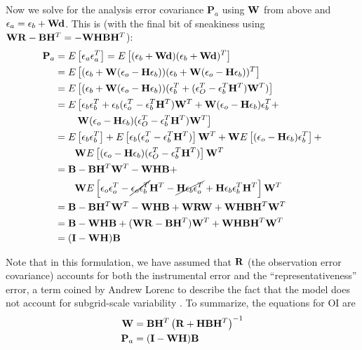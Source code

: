 \documentclass[12pt]{report}
\begin{document}
Now we solve for the analysis error covariance $\mathbf{P} _a $ using $\mbW$ from above and $\mbe _a = \mbe _b + \mbW \mbd$.
This is (with the final bit of sneakiness using $\mbW\mbR-\mbB\mbH^T=-\mbW\mbH\mbB\mbH^T$):
\begin{align*} \mathbf{P} _a &= \expv{\mbe_a \mbe_a^T} = \expv{(\mbe_b+ \mbW \mbd)(\mbe_b + \mbW \mbd)^T}\\
&= \expv{(\mbe_b + \mbW (\mbe _o - \mbH \mbe _b ) ) (\mbe_b + \mbW (\mbe _o - \mbH \mbe _b ) )^T}\\
&= \expv{(\mbe_b + \mbW (\mbe _o - \mbH \mbe _b ) ) (\mbe_b^T + (\mbe _O^T -  \mbe _b^T \mbH ^T )\mbW ^T )}\\
&= E \left [ \mbe_b\mbe_b^T + \mbe_b (\mbe _o^T -  \mbe _b^T \mbH ^T )\mbW ^T + \mbW (\mbe _o - \mbH \mbe _b )  \mbe _b ^T + \right.\\
&~~~~~~\left. \mbW (\mbe _o - \mbH \mbe _b )  (\mbe _O^T -  \mbe _b^T \mbH ^T )\mbW ^T \right ] \\
&= \expv{\mbe_b\mbe_b^T}  + \expv{\mbe_b (\mbe _o^T -  \mbe _b^T \mbH ^T )} \mbW ^T + \mbW \expv{ (\mbe _o - \mbH \mbe _b )  \mbe _b ^T} + \\
&~~~~~~\mbW \expv{(\mbe _o - \mbH \mbe _b )  (\mbe _O^T -  \mbe _b^T \mbH ^T )}\mbW ^T\\
&= \mbB - \mbB \mbH ^T \mbW^T - \mbW \mbH \mbB + \\
&~~~~~~\mbW \expv{\mbe_o\mbe_o^T - \cancel{\mbe_o\mbe_b^T}\mbH ^T - \cancel{\mbH \mbe _b \mbe _o ^T } + \mbH \mbe_b \mbe_b^T \mbH ^T }\mbW ^T\\
&= \mbB - \mbB \mbH ^T \mbW^T - \mbW \mbH \mbB +\mbW \mbR \mbW+  \mbW \mbH \mbB \mbH ^T \mbW ^T\\
&= \mbB - \mbW\mbH\mbB + (\mbW \mbR - \mbB \mbH^T ) \mbW^T + \mbW \mbH \mbB \mbH ^T \mbW ^T\\
&=(\mathbf{I} - \mbW \mbH ) \mbB \end{align*}

Note that in this formulation, we have assumed that $\mbR$ (the observation error covariance) accounts for both the instrumental error and the ``representativeness'' error, a term coined by Andrew Lorenc to describe the fact that the model does not account for subgrid-scale variability .
To summarize, the equations for OI are 
\begin{align} \mbW &= \mbB \mbH ^T \left ( \mbR + \mbH \mbB \mbH ^T \right ) ^{-1}  \\
\mathbf{P} _a &=(\mathbf{I} - \mbW \mbH ) \mbB \end{align}
\end{document}
